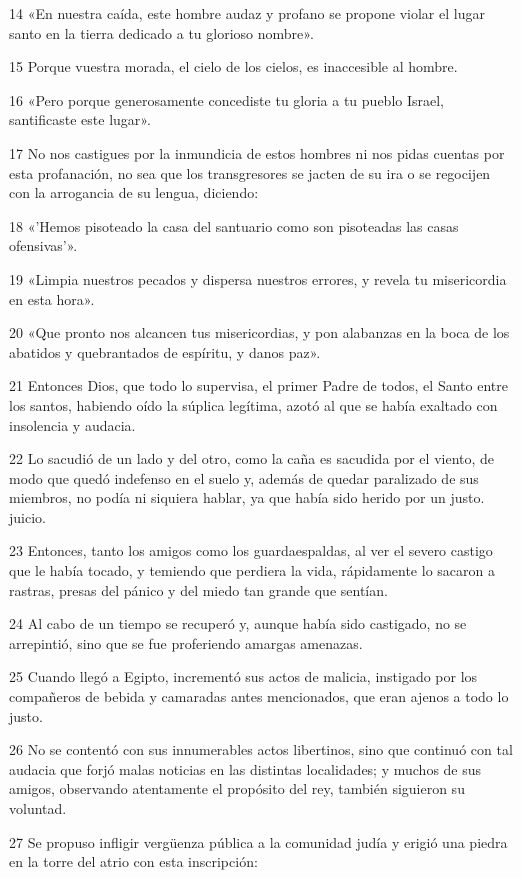 \par 14 «En nuestra caída, este hombre audaz y profano se propone violar el lugar santo en la tierra dedicado a tu glorioso nombre».
\par 15 Porque vuestra morada, el cielo de los cielos, es inaccesible al hombre.
\par 16 «Pero porque generosamente concediste tu gloria a tu pueblo Israel, santificaste este lugar».
\par 17 No nos castigues por la inmundicia de estos hombres ni nos pidas cuentas por esta profanación, no sea que los transgresores se jacten de su ira o se regocijen con la arrogancia de su lengua, diciendo:
\par 18 «'Hemos pisoteado la casa del santuario como son pisoteadas las casas ofensivas'».
\par 19 «Limpia nuestros pecados y dispersa nuestros errores, y revela tu misericordia en esta hora».
\par 20 «Que pronto nos alcancen tus misericordias, y pon alabanzas en la boca de los abatidos y quebrantados de espíritu, y danos paz».
\par 21 Entonces Dios, que todo lo supervisa, el primer Padre de todos, el Santo entre los santos, habiendo oído la súplica legítima, azotó al que se había exaltado con insolencia y audacia.
\par 22 Lo sacudió de un lado y del otro, como la caña es sacudida por el viento, de modo que quedó indefenso en el suelo y, además de quedar paralizado de sus miembros, no podía ni siquiera hablar, ya que había sido herido por un justo. juicio.
\par 23 Entonces, tanto los amigos como los guardaespaldas, al ver el severo castigo que le había tocado, y temiendo que perdiera la vida, rápidamente lo sacaron a rastras, presas del pánico y del miedo tan grande que sentían.
\par 24 Al cabo de un tiempo se recuperó y, aunque había sido castigado, no se arrepintió, sino que se fue proferiendo amargas amenazas.
\par 25 Cuando llegó a Egipto, incrementó sus actos de malicia, instigado por los compañeros de bebida y camaradas antes mencionados, que eran ajenos a todo lo justo.
\par 26 No se contentó con sus innumerables actos libertinos, sino que continuó con tal audacia que forjó malas noticias en las distintas localidades; y muchos de sus amigos, observando atentamente el propósito del rey, también siguieron su voluntad.
\par 27 Se propuso infligir vergüenza pública a la comunidad judía y erigió una piedra en la torre del atrio con esta inscripción:
